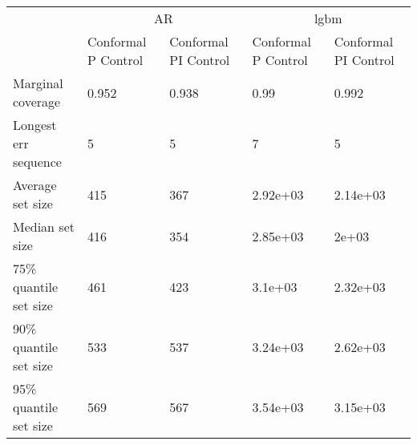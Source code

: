 \begin{tabular}{lllll}
\toprule
& \multicolumn{2}{c}{AR}& \multicolumn{2}{c}{lgbm} \\
& Conformal P Control & Conformal PI Control & Conformal P Control & Conformal PI Control \\
\midrule
Marginal coverage & 0.952 & 0.938 & 0.99 & 0.992 \\
Longest err sequence & 5 & 5 & 7 & 5 \\
Average set size & 415 & 367 & 2.92e+03 & 2.14e+03 \\
Median set size & 416 & 354 & 2.85e+03 & 2e+03 \\
75\% quantile set size & 461 & 423 & 3.1e+03 & 2.32e+03 \\
90\% quantile set size & 533 & 537 & 3.24e+03 & 2.62e+03 \\
95\% quantile set size & 569 & 567 & 3.54e+03 & 3.15e+03 \\
\bottomrule
\end{tabular}
